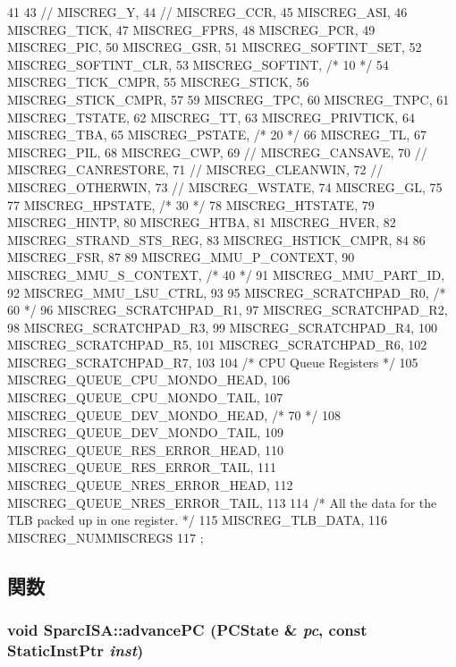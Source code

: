 \begin{DoxyCode}
41 {
43 //    MISCREG_Y,
44 //    MISCREG_CCR,
45     MISCREG_ASI,
46     MISCREG_TICK,
47     MISCREG_FPRS,
48     MISCREG_PCR,
49     MISCREG_PIC,
50     MISCREG_GSR,
51     MISCREG_SOFTINT_SET,
52     MISCREG_SOFTINT_CLR,
53     MISCREG_SOFTINT, /* 10 */
54     MISCREG_TICK_CMPR,
55     MISCREG_STICK,
56     MISCREG_STICK_CMPR,
57 
59     MISCREG_TPC,
60     MISCREG_TNPC,
61     MISCREG_TSTATE,
62     MISCREG_TT,
63     MISCREG_PRIVTICK,
64     MISCREG_TBA,
65     MISCREG_PSTATE, /* 20 */
66     MISCREG_TL,
67     MISCREG_PIL,
68     MISCREG_CWP,
69 //    MISCREG_CANSAVE,
70 //    MISCREG_CANRESTORE,
71 //    MISCREG_CLEANWIN,
72 //    MISCREG_OTHERWIN,
73 //    MISCREG_WSTATE,
74     MISCREG_GL,
75 
77     MISCREG_HPSTATE, /* 30 */
78     MISCREG_HTSTATE,
79     MISCREG_HINTP,
80     MISCREG_HTBA,
81     MISCREG_HVER,
82     MISCREG_STRAND_STS_REG,
83     MISCREG_HSTICK_CMPR,
84 
86     MISCREG_FSR,
87 
89     MISCREG_MMU_P_CONTEXT,
90     MISCREG_MMU_S_CONTEXT, /* 40 */
91     MISCREG_MMU_PART_ID,
92     MISCREG_MMU_LSU_CTRL,
93 
95     MISCREG_SCRATCHPAD_R0, /* 60 */
96     MISCREG_SCRATCHPAD_R1,
97     MISCREG_SCRATCHPAD_R2,
98     MISCREG_SCRATCHPAD_R3,
99     MISCREG_SCRATCHPAD_R4,
100     MISCREG_SCRATCHPAD_R5,
101     MISCREG_SCRATCHPAD_R6,
102     MISCREG_SCRATCHPAD_R7,
103 
104     /* CPU Queue Registers */
105     MISCREG_QUEUE_CPU_MONDO_HEAD,
106     MISCREG_QUEUE_CPU_MONDO_TAIL,
107     MISCREG_QUEUE_DEV_MONDO_HEAD, /* 70 */
108     MISCREG_QUEUE_DEV_MONDO_TAIL,
109     MISCREG_QUEUE_RES_ERROR_HEAD,
110     MISCREG_QUEUE_RES_ERROR_TAIL,
111     MISCREG_QUEUE_NRES_ERROR_HEAD,
112     MISCREG_QUEUE_NRES_ERROR_TAIL,
113 
114     /* All the data for the TLB packed up in one register. */
115     MISCREG_TLB_DATA,
116     MISCREG_NUMMISCREGS
117 };
\end{DoxyCode}


\subsection{関数}
\hypertarget{namespaceSparcISA_acb3999b0d01cc0f4d8bb909b234dfa96}{
\subsubsection[{advancePC}]{\setlength{\rightskip}{0pt plus 5cm}void SparcISA::advancePC (PCState \& {\em pc}, \/  const {\bf StaticInstPtr} {\em inst})}}
\label{namespaceSparcISA_acb3999b0d01cc0f4d8bb909b234dfa96}



